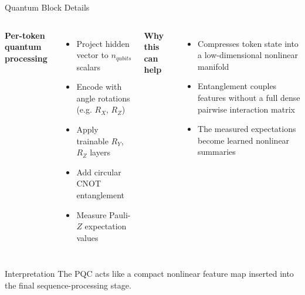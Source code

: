 \documentclass[aspectratio=169,professionalfonts]{beamer}
\begin{document}
\begin{frame}{Quantum Block Details}
\begin{columns}[T]
\textbf{Per-token quantum processing}
\begin{itemize}
  \item Project hidden vector to $n_{qubits}$ scalars
  \item Encode with angle rotations (e.g. $R_X$, $R_Z$)
  \item Apply trainable $R_Y$, $R_Z$ layers
  \item Add circular CNOT entanglement
  \item Measure Pauli-$Z$ expectation values
\end{itemize}

\textbf{Why this can help}
\begin{itemize}
  \item Compresses token state into a low-dimensional nonlinear manifold
  \item Entanglement couples features without a full dense pairwise interaction matrix
  \item The measured expectations become learned nonlinear summaries
\end{itemize}
\end{columns}

\vspace{0.5em}
\begin{block}{Interpretation}
The PQC acts like a compact nonlinear feature map inserted into the final sequence-processing stage.
\end{block}
\end{frame}
\end{document}
